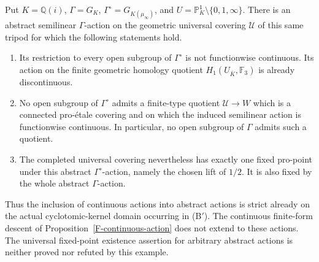 \begin{proposition}
\label{F-cyclotomic-discontinuous-action}
Put $K=\mathbb Q(i)$, $\Gamma=G_K$,
$\Gamma^\circ=G_{K(\mu_\infty)}$, and
$U=\mathbb P^1_K\setminus\{0,1,\infty\}$.
There is an abstract semilinear $\Gamma$-action on the
geometric universal covering $\mathcal U$ of this same
tripod for which the following statements hold.
\begin{enumerate}
\item Its restriction to every open subgroup of
$\Gamma^\circ$ is not functionwise continuous. Its action
on the finite geometric homology quotient
$H_1(U_{\overline K},\mathbb F_3)$ is already discontinuous.
\item No open subgroup of $\Gamma^\circ$ admits a
finite-type quotient $\mathcal U\to W$ which is a
connected pro-\'etale covering and on which the induced
semilinear action is functionwise continuous. In particular,
no open subgroup of $\Gamma$ admits such a quotient.
\item The completed universal covering nevertheless has
exactly one fixed pro-point under this abstract
$\Gamma^\circ$-action, namely the chosen lift of $1/2$.
It is also fixed by the whole abstract $\Gamma$-action.
\end{enumerate}
Thus the inclusion of continuous actions into abstract
actions is strict already on the actual cyclotomic-kernel
domain occurring in (B$'$). The continuous finite-form
descent of Proposition~\ref{F-continuous-action} does not
extend to these actions. The universal fixed-point
existence assertion for arbitrary abstract actions is
neither proved nor refuted by this example.
\end{proposition}
